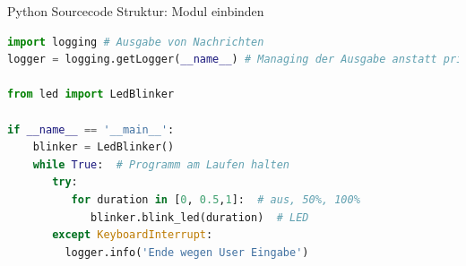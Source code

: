 \begin{frame}[fragile]{Python Sourcecode Struktur: Modul einbinden}
\begin{lstlisting}[language=Python]
import logging # Ausgabe von Nachrichten
logger = logging.getLogger(__name__) # Managing der Ausgabe anstatt print() Funktion

from led import LedBlinker

if __name__ == '__main__':
    blinker = LedBlinker()
    while True:  # Programm am Laufen halten
       try:
          for duration in [0, 0.5,1]:  # aus, 50%, 100%
             blinker.blink_led(duration)  # LED 
       except KeyboardInterrupt:  
         logger.info('Ende wegen User Eingabe')

\end{lstlisting}
\end{frame}



